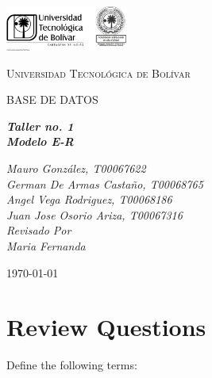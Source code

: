 \documentclass[letterpaper, 12pt]{report}
\begin{document}
\begin{titlepage}
	\centering
	\includegraphics[width=0.3\textwidth]{Images/logo_utb.png}\par\vspace{1cm}
	{\scshape\LARGE Universidad Tecnológica de Bolívar \par}
	\vspace{.5cm}

	{\scshape\Large BASE DE DATOS \par}
	\vspace{.7cm}

	\slshape {\Large \bfseries{}Taller no. 1\\}
	\slshape {\small \bfseries{}Modelo E-R}
	\vspace{1cm}

	\slshape {\itshape{} Mauro González, T00067622 \\}
	\slshape {\itshape{} German De Armas Castaño, T00068765 \\}
	\slshape {\itshape{} Angel Vega Rodriguez, T00068186 \\}
	\slshape {\itshape{} Juan Jose Osorio Ariza, T00067316 \\}
	\vfill
	Revisado Por \\
	Maria Fernanda\\
	{\large \today\par}
\end{titlepage}

\section{Review Questions}

Define the following terms:
\end{document}
